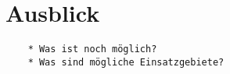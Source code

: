 \chapter{Ausblick}

\begin{verbatim}
    * Was ist noch möglich?
    * Was sind mögliche Einsatzgebiete? 
\end{verbatim}

